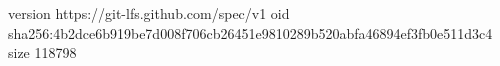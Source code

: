 version https://git-lfs.github.com/spec/v1
oid sha256:4b2dce6b919be7d008f706cb26451e9810289b520abfa46894ef3fb0e511d3c4
size 118798
